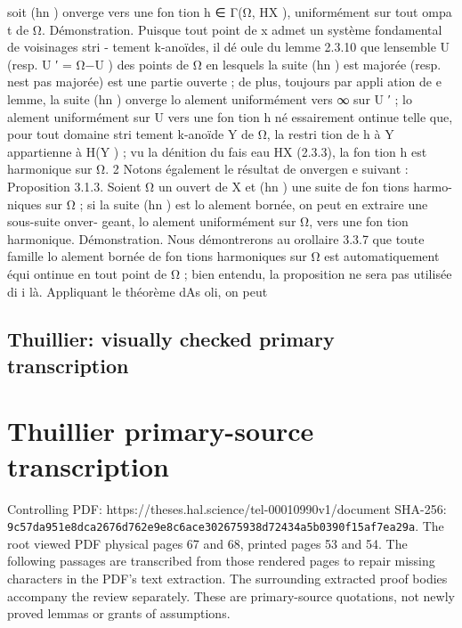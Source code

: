 \documentclass[
  10pt,
]{article}
\newenvironment{Shaded}{}{}
\newcommand{\NormalTok}[1]{#1}
\begin{document}
\begin{Shaded}
\begin{Highlighting}[]
\NormalTok{   soit (hn ) onverge vers une fon tion h ∈ Γ(Ω, HX ), uniformément sur tout ompa t de}
\NormalTok{     Ω.}
\NormalTok{Démonstration. Puisque tout point de x admet un système fondamental de voisinages stri {-}}
\NormalTok{tement k{-}anoïdes, il dé oule du lemme 2.3.10 que l\textquotesingle{}ensemble U (resp. U ′ = Ω−U ) des points}
\NormalTok{de Ω en lesquels la suite (hn ) est majorée (resp. n\textquotesingle{}est pas majorée) est une partie ouverte ; de}
\NormalTok{plus, toujours par appli ation de e lemme, la suite (hn ) onverge}
\NormalTok{   lo alement uniformément vers ∞ sur U ′ ;}
\NormalTok{   lo alement uniformément sur U vers une fon tion h  né essairement ontinue  telle que,}
\NormalTok{     pour tout domaine stri tement k{-}anoïde Y de Ω, la restri tion de h à Y appartienne à}
\NormalTok{     H(Y ) ; vu la dénition du fais eau HX (2.3.3), la fon tion h est harmonique sur Ω.}
\NormalTok{                                                                                               2}
\NormalTok{   Notons également le résultat de onvergen e suivant :}
\NormalTok{Proposition 3.1.3.  Soient Ω un ouvert de X et (hn ) une suite de fon tions harmo{-}}
\NormalTok{niques sur Ω ; si la suite (hn ) est lo alement bornée, on peut en extraire une sous{-}suite onver{-}}
\NormalTok{geant, lo alement uniformément sur Ω, vers une fon tion harmonique.}
\NormalTok{Démonstration. Nous démontrerons au orollaire 3.3.7 que toute famille lo alement bornée}
\NormalTok{de fon tions harmoniques sur Ω est automatiquement équi ontinue en tout point de Ω ; bien}
\NormalTok{entendu, la proposition ne sera pas utilisée d\textquotesingle{}i i là. Appliquant le théorème d\textquotesingle{}As oli, on peut}
\end{Highlighting}
\end{Shaded}

\subsection{Thuillier: visually checked primary
transcription}\label{thuillier-visually-checked-primary-transcription}

\section{Thuillier primary-source
transcription}\label{thuillier-primary-source-transcription}

Controlling PDF: https://theses.hal.science/tel-00010990v1/document
SHA-256:
\nolinkurl{9c57da951e8dca2676d762e9e8c6ace302675938d72434a5b0390f15af7ea29a}. The
root viewed PDF physical pages 67 and 68, printed pages 53 and 54. The
following passages are transcribed from those rendered pages to repair
missing characters in the PDF's text extraction. The surrounding
extracted proof bodies accompany the review separately. These are
primary-source quotations, not newly proved lemmas or grants of
assumptions.
\end{document}
